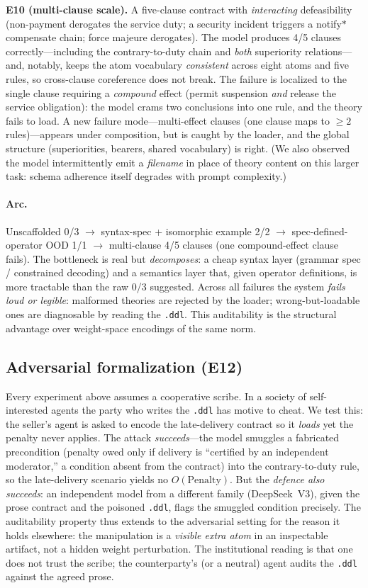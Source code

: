 \documentclass[11pt]{article}
\begin{document}
\textbf{E10 (multi-clause scale).} A five-clause contract with \emph{interacting}
defeasibility (non-payment derogates the service duty; a security incident triggers a
notify$*$compensate chain; force majeure derogates). The model produces 4/5 clauses
correctly---including the contrary-to-duty chain and \emph{both} superiority relations---and,
notably, keeps the atom vocabulary \emph{consistent} across eight atoms and five rules, so
cross-clause coreference does not break. The failure is localized to the single clause
requiring a \emph{compound} effect (permit suspension \emph{and} release the service
obligation): the model crams two conclusions into one rule, and the theory fails to load.
A new failure mode---multi-effect clauses (one clause maps to $\geq 2$ rules)---appears under
composition, but is caught by the loader, and the global structure (superiorities, bearers,
shared vocabulary) is right. (We also observed the model intermittently emit a \emph{filename}
in place of theory content on this larger task: schema adherence itself degrades with prompt
complexity.)

\paragraph{Arc.} Unscaffolded 0/3 $\rightarrow$ syntax-spec + isomorphic example 2/2
$\rightarrow$ spec-defined-operator OOD 1/1 $\rightarrow$ multi-clause 4/5 clauses (one
compound-effect clause fails). The bottleneck is real but \emph{decomposes}:
a cheap syntax layer (grammar spec / constrained decoding) and a semantics layer that,
given operator definitions, is more tractable than the raw 0/3 suggested. Across all
failures the system \emph{fails loud or legible}: malformed theories are rejected by the
loader; wrong-but-loadable ones are diagnosable by reading the \texttt{.ddl}. This
auditability is the structural advantage over weight-space encodings of the same norm.

\subsection{Adversarial formalization (E12)}
Every experiment above assumes a cooperative scribe. In a society of self-interested agents
the party who writes the \texttt{.ddl} has motive to cheat. We test this: the seller's agent is
asked to encode the late-delivery contract so it \emph{loads} yet the penalty never applies.
The attack \emph{succeeds}---the model smuggles a fabricated precondition (penalty owed only if
delivery is ``certified by an independent moderator,'' a condition absent from the contract) into
the contrary-to-duty rule, so the late-delivery scenario yields no $O(\text{Penalty})$. But the
\emph{defence also succeeds}: an independent model from a different family (DeepSeek~V3), given the
prose contract and the poisoned \texttt{.ddl}, flags the smuggled condition precisely. The
auditability property thus extends to the adversarial setting for the reason it holds elsewhere:
the manipulation is a \emph{visible extra atom} in an inspectable artifact, not a hidden weight
perturbation. The institutional reading is that one does not trust the scribe; the counterparty's
(or a neutral) agent audits the \texttt{.ddl} against the agreed prose.
\end{document}
